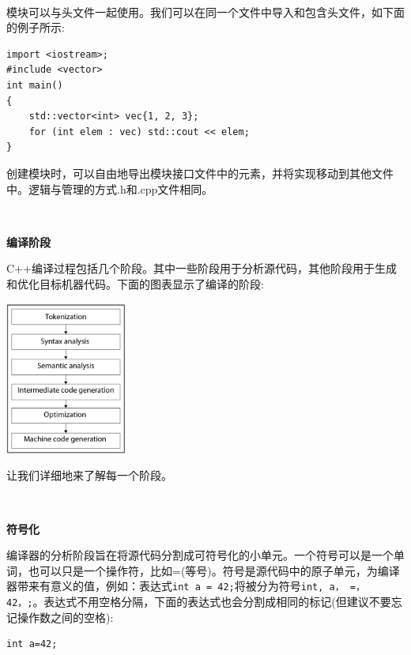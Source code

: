 \noindent\textbf{}\ \par
模块可以与头文件一起使用。我们可以在同一个文件中导入和包含头文件，如下面的例子所示: \par

\begin{lstlisting}[caption={}]
import <iostream>;
#include <vector>
int main()
{
	std::vector<int> vec{1, 2, 3};
	for (int elem : vec) std::cout << elem;
}
\end{lstlisting}

创建模块时，可以自由地导出模块接口文件中的元素，并将实现移动到其他文件中。逻辑与管理的方式.h和.cpp文件相同。 \par

\noindent\textbf{}\ \par
\textbf{编译阶段}\ \par
C++编译过程包括几个阶段。其中一些阶段用于分析源代码，其他阶段用于生成和优化目标机器代码。下面的图表显示了编译的阶段:\par

\begin{center}
	\includegraphics[width=0.3\textwidth]{content/Section-1/Chapter-1/2}
\end{center}

让我们详细地来了解每一个阶段。 \par

\noindent\textbf{}\ \par
\textbf{符号化}\ \par
编译器的分析阶段旨在将源代码分割成可符号化的小单元。一个符号可以是一个单词，也可以只是一个操作符，比如=(等号)。符号是源代码中的原子单元，为编译器带来有意义的值，例如：表达式\texttt{int a = 42;}将被分为符号\texttt{int, a， =， 42，;}。表达式不用空格分隔，下面的表达式也会分割成相同的标记(但建议不要忘记操作数之间的空格): \par

\begin{lstlisting}[caption={}]
int a=42;
\end{lstlisting}
	
